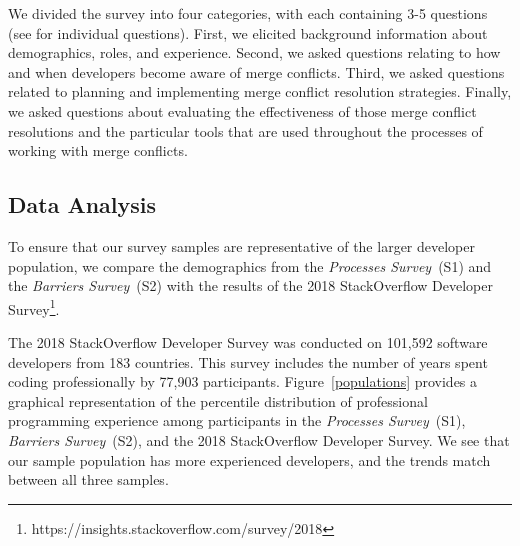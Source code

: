 We divided the survey into four categories, with each containing 3-5 questions (see \cite{companion_site} for individual questions).
First, we elicited background information about demographics, roles, and experience.
Second, we asked questions relating to how and when developers become aware of merge conflicts.
Third, we asked questions related to planning and implementing merge conflict resolution strategies.
Finally, we asked questions about evaluating the effectiveness of those merge conflict resolutions and the particular tools that are used throughout the processes of working with merge conflicts.

\subsection{Data Analysis}\label{analysis}
To ensure that our survey samples are representative of the larger developer population, we compare the demographics from the \textit{Processes Survey}~(S1) and the \textit{Barriers Survey}~(S2) with the results of the 2018 StackOverflow Developer Survey\footnote{https://insights.stackoverflow.com/survey/2018}.

The 2018 StackOverflow Developer Survey was conducted on 101,592 software developers from 183 countries.
This survey includes the number of years spent coding professionally by 77,903 participants.
Figure~\ref{populations} provides a graphical representation of the percentile distribution of professional programming experience among participants in the \textit{Processes Survey}~(S1), \textit{Barriers Survey}~(S2), and the 2018 StackOverflow Developer Survey.
We see that our sample population has more experienced developers, and the trends match between all three samples.


